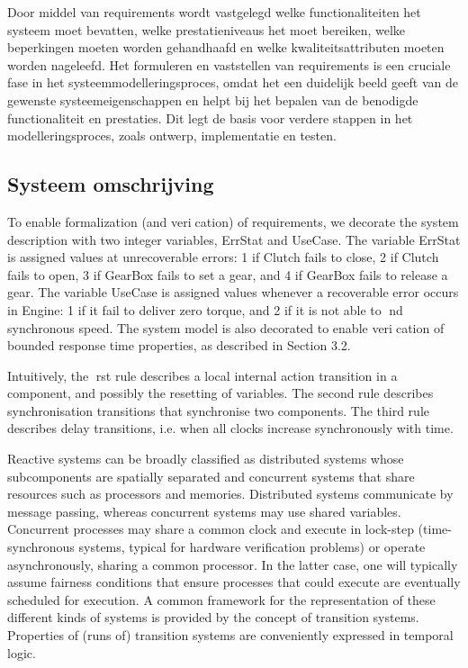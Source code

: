 \documentclass{article}
\begin{document}
	
	Door middel van requirements wordt vastgelegd welke functionaliteiten het systeem moet bevatten, welke prestatieniveaus het moet bereiken, welke beperkingen moeten worden gehandhaafd en welke kwaliteitsattributen moeten worden nageleefd.
	Het formuleren en vaststellen van requirements is een cruciale fase in het systeemmodelleringsproces, omdat het een duidelijk beeld geeft van de gewenste systeemeigenschappen en helpt bij het bepalen van de benodigde functionaliteit en prestaties. Dit legt de basis voor verdere stappen in het modelleringsproces, zoals ontwerp, implementatie en testen.
	
	\subsection{Systeem omschrijving}
	To enable formalization (and verication) of requirements, we decorate the system description with
	two integer variables, ErrStat and UseCase. The variable ErrStat is assigned values at unrecoverable
	errors: 1 if Clutch fails to close, 2 if Clutch fails to open, 3 if GearBox fails to set a gear, and 4 if GearBox
	fails to release a gear. The variable UseCase is assigned values whenever a recoverable error occurs in
	Engine: 1 if it fail to deliver zero torque, and 2 if it is not able to nd synchronous speed. The system
	model is also decorated to enable verication of bounded response time properties, as described in
	Section 3.2.
	
	Intuitively, the rst rule describes a local internal action transition in a component,
	and possibly the resetting of variables.
	The second rule describes synchronisation transitions that synchronise two
	components.
	The third rule describes delay transitions, i.e. when all clocks increase synchronously
	with time.
	
	
	Reactive systems can be broadly classified as distributed systems whose subcomponents
	are spatially separated and concurrent systems that share resources such as processors
	and memories. Distributed systems communicate by message passing, whereas
	concurrent systems may use shared variables. Concurrent processes may share a common
	clock and execute in lock-step (time-synchronous systems, typical for hardware
	verification problems) or operate asynchronously, sharing a common processor. In the
	latter case, one will typically assume fairness conditions that ensure processes that
	could execute are eventually scheduled for execution. A common framework for the
	representation of these different kinds of systems is provided by the concept of transition
	systems. Properties of (runs of) transition systems are conveniently expressed in
	temporal logic.
	
\end{document}
